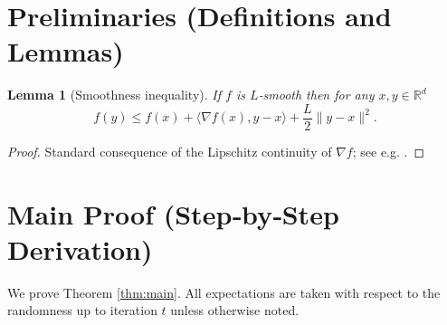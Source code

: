 \documentclass{article}
\newtheorem{lemma}{Lemma}
\newcommand{\R}{\mathbb{R}}
\begin{document}
\newpage
\section*{Preliminaries (Definitions and Lemmas)}
\begin{lemma}[Smoothness inequality]\label{lem:smooth}
If $f$ is $L$‑smooth then for any $x,y\in\R^{d}$
\[
f(y)\le f(x)+\langle\nabla f(x),y-x\rangle
+\frac{L}{2}\|y-x\|^{2}.
\tag{L1}
\]
\end{lemma}
\begin{proof}
Standard consequence of the Lipschitz continuity of $\nabla f$; see
e.g. \cite{nesterov2004introductory}.
\end{proof}

\section*{Main Proof (Step‑by‑Step Derivation)}
We prove Theorem \ref{thm:main}.  All expectations are taken with respect to
the randomness up to iteration $t$ unless otherwise noted.
\end{document}
